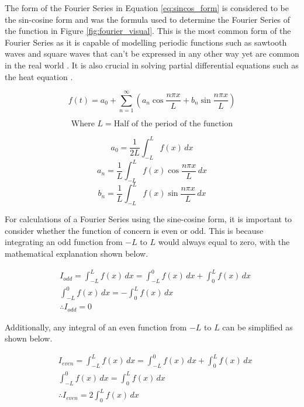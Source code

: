 \documentclass[letterpaper, 12pt]{article}
\begin{document}
The form of the Fourier Series in Equation \ref*{eq:sincos_form} is considered
to be the sin-cosine form and was the formula used to determine
the Fourier Series of the function in Figure \ref*{fig:fourier_visual}.
This is the most common form of the Fourier Series
as it is capable of modelling periodic functions such as
sawtooth waves and square waves that can't be expressed
in any other way yet are common in the real world \cite{FourierSeriesDefinition}.
It is also crucial in solving partial differential equations
such as the heat equation \cite{sandersonWhatFourierSeries2019}.

\begin{equation}
    \label{eq:sincos_form}
    f(t) = a_0 + \sum_{n=1}^{\infty} (a_n \cos \frac{n\pi x}{L} + b_n \sin \frac{n\pi x}{L})
\end{equation}

\[
    \text{Where } L = \text{Half of the period of the function}
\]

\begin{equation}
    \label{eq:a_not}
    a_0 = \frac{1}{2L} \int_{-L}^{L} f(x) \,dx
\end{equation}
\begin{equation}
    \label{eq:a_n}
    a_n = \frac{1}{L} \int_{-L}^{L} f(x) \cos \frac{n\pi x}{L} \,dx
\end{equation}
\begin{equation}
    \label{eq:b_n}
    b_n = \frac{1}{L} \int_{-L}^{L} f(x) \sin \frac{n\pi x}{L} \,dx
\end{equation}

For calculations of a Fourier Series using the sine-cosine form,
it is important to consider whether the function of concern
is even or odd. This is because integrating an odd function
from \(-L\) to \(L\) would always equal to zero,
with the mathematical explanation shown below.

\begin{align*}
     & I_{odd} = \int_{-L}^{L} f(x) \,dx = \int_{-L}^{0} f(x) \,dx + \int_{0}^{L} f(x) \,dx
    \\
     & \int_{-L}^{0} f(x) \,dx = -\int_{0}^{L} f(x) \,dx
    \\
     & \therefore I_{odd} = 0
\end{align*}

Additionally, any integral of an even function from \(-L\) to \(L\) can be simplified
as shown below.

\begin{align*}
     & I_{even} = \int_{-L}^{L} f(x) \,dx = \int_{-L}^{0} f(x) \,dx + \int_{0}^{L} f(x) \,dx
    \\
     & \int_{-L}^{0} f(x) \,dx = \int_{0}^{L} f(x) \,dx
    \\
     & \therefore I_{even} = 2\int_{0}^{L} f(x) \,dx
\end{align*}
\end{document}
